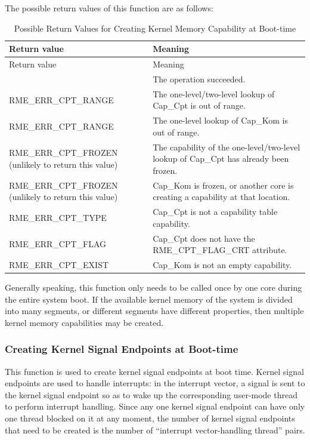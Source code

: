 The possible return values of this function are as follows:

\begin{xltabular}{\textwidth}{@{}>{\hsize\raggedright\arraybackslash}X>{\hsize\raggedright\arraybackslash}X@{}}
\caption{Possible Return Values for Creating Kernel Memory Capability at Boot-time}\label{tab:7-56-create-kernel-memory-capability-at-boot-return-values}\\
\toprule
Return value & Meaning\tabularnewline
\endfirsthead
\toprule
Return value & Meaning\tabularnewline
\midrule
\endhead
\bottomrule
{} & The operation succeeded.\tabularnewline
    RME\_ERR\_CPT\_RANGE & The one-level/two-level lookup of Cap\_Cpt is out of range.\tabularnewline
    RME\_ERR\_CPT\_RANGE & The one-level lookup of Cap\_Kom is out of range.\tabularnewline
    RME\_ERR\_CPT\_FROZEN (unlikely to return this value) & The capability of the one-level/two-level lookup of Cap\_Cpt has already been frozen.\tabularnewline
    RME\_ERR\_CPT\_FROZEN (unlikely to return this value) & Cap\_Kom is frozen, or another core is creating a capability at that location.\tabularnewline
    RME\_ERR\_CPT\_TYPE & Cap\_Cpt is not a capability table capability.\tabularnewline
    RME\_ERR\_CPT\_FLAG & Cap\_Cpt does not have the RME\_CPT\_FLAG\_CRT attribute.\tabularnewline
    RME\_ERR\_CPT\_EXIST & Cap\_Kom is not an empty capability.\tabularnewline
\end{xltabular}
\nopagebreak[4]

Generally speaking, this function only needs to be called once by one core during the entire system boot. If the available kernel memory of the system is divided into many segments, or different segments have different properties, then multiple kernel memory capabilities may be created.

\subsubsection{Creating Kernel Signal Endpoints at Boot-time}\label{subsubsec:7-create-kernel-signal-endpoint-at-boot}

This function is used to create kernel signal endpoints at boot time. Kernel signal endpoints are used to handle interrupts: in the interrupt vector, a signal is sent to the kernel signal endpoint so as to wake up the corresponding user-mode thread to perform interrupt handling. Since any one kernel signal endpoint can have only one thread blocked on it at any moment, the number of kernel signal endpoints that need to be created is the number of ``interrupt vector-handling thread'' pairs.

